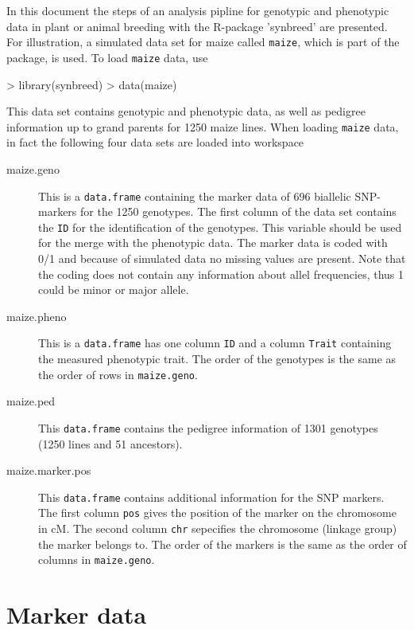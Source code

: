 \documentclass[a4paper,11pt]{article}
\begin{document}
In this document the steps of an analysis pipline for genotypic and phenotypic data in plant or animal breeding with the R-package 'synbreed' are presented. For illustration, a simulated data set for maize called \texttt{maize}, which is part of the package, is used. 
To load \texttt{maize} data, use
\begin{Schunk}
\begin{Sinput}
> library(synbreed)
> data(maize)
\end{Sinput}
\end{Schunk}
This data set contains genotypic and phenotypic data, as well as pedigree information up to grand parents for 1250 maize lines. When loading \texttt{maize} data, in fact the following
four data sets are loaded into workspace
\begin{description}
\item[maize.geno]  This is a \texttt{data.frame} containing the marker data of 696 biallelic SNP-markers for the 1250 genotypes. 
The first column of the data set contains the \texttt{ID} for the identification of the genotypes.
This variable should be used for the merge with the phenotypic data. 
The marker data is coded with 0/1 and because of simulated data no missing values are present. 
Note that the coding does not contain any information about allel frequencies, thus 1 could be minor or major allele.
\item[maize.pheno] This is a \texttt{data.frame} has one column \texttt{ID} and a column \texttt{Trait} containing the measured phenotypic trait. The order of the genotypes is the same as the order of rows in \texttt{maize.geno}.
\item[maize.ped] This  \texttt{data.frame} contains the pedigree information of  1301 genotypes (1250 lines and 51 ancestors). 
\item[maize.marker.pos]  This  \texttt{data.frame} contains additional information for the SNP markers. The first column \texttt{pos} gives the position of the marker on the chromosome in cM. The second column \texttt{chr} sepecifies the chromosome (linkage group) the marker belongs to. The order of the markers is the same as the order of columns in \texttt{maize.geno}.
\end{description}

\section{Marker data}\label{sec:Markerdata}
\end{document}
